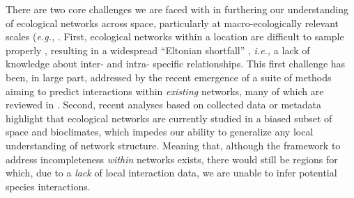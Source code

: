 There are two core challenges we are faced with in furthering our
understanding of ecological networks across space, particularly at
macro-ecologically relevant scales (\emph{e.g.,} \cite{Trojelsgaard2016EcoNet}.
First, ecological networks within a location are difficult to sample
properly \cite{Jordano2016ChaEco, Jordano2016SamNet}, resulting in a
widespread ``Eltonian shortfall'' \cite{Hortal2015SevSho}, \emph{i.e.,} a
lack of knowledge about inter- and intra- specific relationships. This
first challenge has been, in large part, addressed by the recent
emergence of a suite of methods aiming to predict interactions within
\emph{existing} networks, many of which are reviewed in
\cite{Strydom2021RoaPre}. Second, recent analyses based on collected data
\cite{Poisot2021GloKno} or metadata \cite{Cameron2019UneGlo} highlight
that ecological networks are currently studied in a biased subset of
space and bioclimates, which impedes our ability to generalize any local
understanding of network structure. Meaning that, although the framework
to address incompleteness \emph{within} networks exists, there would
still be regions for which, due to a \emph{lack} of local interaction
data, we are unable to infer potential species interactions.

